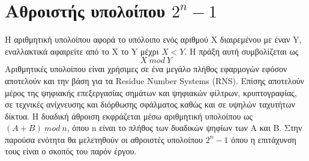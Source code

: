 \section{Αθροιστής υπολοίπου $2^n-1$}
\label{section:mod_addition}
Η αριθμητική υπολοίπου αφορά το υπόλοιπο ενός αριθμού X διαιρεμένου με έναν Y, εναλλακτικά
αφαιρείτε από το Χ το Y μέχρι $X < Y$. Η πράξη αυτή συμβολίζεται ως 
\begin{equation*}
    X\ mod\ Y
\end{equation*}
Αριθμητικές υπολοίπου είναι χρήσιμες σε ένα μεγάλο πλήθος εφαρμογών εφόσον αποτελούν και 
την βάση για τα Residue Number Systems (RNS). Επίσης αποτελούν μέρος της ψηφιακής
επεξεργασίας σημάτων και ψηφιακών φίλτρων, κρυπτογραφίας, σε τεχνικές ανίχνευσης και διόρθωσης σφάλματος καθώς και σε υψηλών ταχυτήτων δίκτυα. Η δυαδική άθροιση εκφράζεται μέσω αριθμητική υπολοίπου ως $(A+B)\ mod\ n$, όπου n είναι το πλήθος των δυαδικών ψηφίων των A και B. Στην παρούσα ενότητα θα μελετηθούν οι αθροιστές υπολοίπου $2^n-1$ όπου η επιτάχυνση τους είναι ο σκοπός του παρόν έργου.






